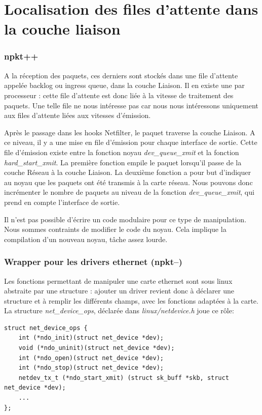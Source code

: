 \documentclass[a4paper]{article}
\begin{document}
\section{Localisation des files d'attente dans la couche liaison}
\subsubsection{npkt++}
A la réception des paquets, ces derniers sont stockés dans une file d’attente appelée backlog ou ingress queue, dans la couche Liaison. Il en existe une par processeur : cette file d’attente est donc liée à la vitesse de traitement des paquets. Une telle file ne nous intéresse pas car nous nous intéressons uniquement aux files d’attente liées aux vitesses d’émission.

Après le passage dans les hooks Netfilter, le paquet traverse la couche Liaison. A ce niveau, il y a une mise en file d’émission pour chaque interface de sortie. Cette file d’émission existe entre la fonction noyau \textit{dev\_queue\_xmit} et la fonction \textit{hard\_start\_xmit}. La première fonction empile le paquet lorsqu’il passe de la couche Réseau à la couche Liaison. La deuxième fonction a pour but d’indiquer au noyau que les paquets ont été transmis à la carte réseau. Nous pouvons donc incrémenter le nombre de paquets au niveau de la fonction \textit{dev\_queue\_xmit}, qui prend en compte l’interface de sortie.

Il n’est pas possible d’écrire un code modulaire pour ce type de manipulation. Nous sommes contraints de modifier le code du noyau. Cela implique la compilation d’un nouveau noyau, tâche assez lourde. 

\subsubsection{Wrapper pour les drivers ethernet (npkt--)}
Les fonctions permettant de manipuler une carte ethernet sont sous
linux abstraite par une structure : ajouter un driver revient donc
à déclarer une structure et à remplir les différents champs, avec
les fonctions adaptées à la carte.
La structure \textit{net\_device\_ops}, déclarée dans
\textit{linux/netdevice.h} joue ce rôle:
\begin{verbatim}
struct net_device_ops {
    int (*ndo_init)(struct net_device *dev);
    void (*ndo_uninit)(struct net_device *dev);
    int (*ndo_open)(struct net_device *dev);
    int (*ndo_stop)(struct net_device *dev);
    netdev_tx_t (*ndo_start_xmit) (struct sk_buff *skb, struct net_device *dev);
    ...
};
\end{verbatim}
\end{document}
